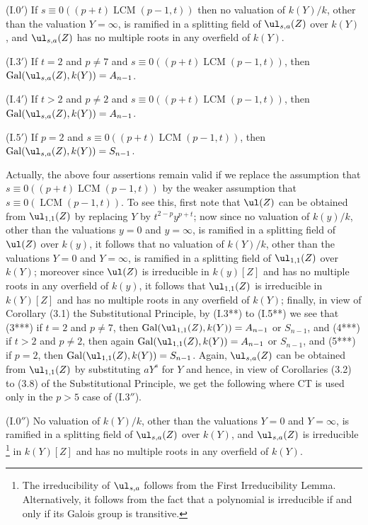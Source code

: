 (I.$0'$) If $s\equiv 0((p+t)\operatorname{LCM}(p-1,t))$ 
then no valuation
of $k(Y)/k$, other than the valuation $Y=\infty$, is 
ramified in a splitting
field of $\ul_{s,a}(Z)$ over $k(Y)$, and $\ul_{s,a}(Z)$ 
has no multiple roots in any overfield of $k(Y)$.

(I.$3'$) If $t=2$ and $p\ne 7$ and $s\equiv 0((p+
t)\operatorname{LCM}(p-1,t))$, 
then$\operatorname{Gal}(\ul_{s,a}(Z),k(Y))=A_{n-1}$.

(I.$4'$) If $t>2$ and $p\ne 2$ and $s\equiv 0((p+
t)\operatorname{LCM}(p-1,t))$, 
then$\operatorname{Gal}(\ul_{s,a}(Z),k(Y))=A_{n-1}$.

(I.$5'$) If $p=2$ and $s\equiv 0((p+
t)\operatorname{LCM}(p-1,t))$, then 
$\operatorname{Gal}(\ul_{s,a}(Z),k(Y))=S_{n-1}$.

Actually, the above four assertions remain valid if we 
replace the assumption
that $s\equiv 0((p+t)\operatorname{LCM}(p-1,t))$ by the 
weaker assumption that
$s\equiv 0(\operatorname{LCM}(p-1,t))$. To see this, first 
note that $\ul(Z)$ can be 
obtained from $\ul_{1,1}(Z)$ by replacing $Y$ by 
$t^{2-p}y^{p+t}$; now since
no valuation of $k(y)/k$, other than the valuations $y=0$ 
and $y=\infty$,  
is ramified in a splitting field of $\ul(Z)$ over $k(y)$, 
it follows that
no valuation of $k(Y)/k$, other than the valuations $Y=0$ 
and $Y=\infty$,  
is ramified in a splitting field of $\ul_{1,1}(Z)$ over 
$k(Y)$; moreover
since $\ul(Z)$ is irreducible in $k(y)[Z]$ and has no 
multiple roots in any
overfield of $k(y)$, it follows that $\ul_{1,1}(Z)$ is 
irreducible in 
$k(Y)[Z]$ and has no multiple roots in any overfield of 
$k(Y)$; finally,
in view of Corollary (3.1) the Substitutional Principle, 
by (I.3**) to
(I.5**) we see that (3***) if $t=2$ and $p\ne 7$, then 
$\operatorname{Gal}(\ul_{1,1}(Z),k(Y))=A_{n-1}$ or 
$S_{n-1}$, and (4***) if
$t>2$ and $p\ne 2$, then again 
$\operatorname{Gal}(\ul_{1,1}(Z),k(Y))=A_{n-1}$ or 
$S_{n-1}$, 
and (5***) if $p=2$, then 
$\operatorname{Gal}(\ul_{1,1}(Z),k(Y))=S_{n-1}$. Again, 
$\ul_{s,a}(Z)$ can be obtained from $\ul_{1,1}(Z)$ by 
substituting
$aY^s$ for $Y$ and hence, in view of Corollaries (3.2) to 
(3.8) of the
Substitutional Principle, we get the following where CT is 
used only in
the $p>5$ case of (I.$3''$). 

(I.$0''$) No valuation of $k(Y)/k$, other than the 
valuations $Y=0$ and 
$Y=\infty$, is ramified in a splitting field of 
$\ul_{s,a}(Z)$ over $k(Y)$, 
and $\ul_{s,a}(Z)$ is irreducible
\footnote{The irreducibility of $\ul_{s,a}$ follows from 
the First 
Irreducibility Lemma. Alternatively, it follows from the 
fact that a 
polynomial is irreducible if and only if its Galois group 
is transitive.}
in $k(Y)[Z]$ and has no multiple roots in any overfield of 
$k(Y)$.


